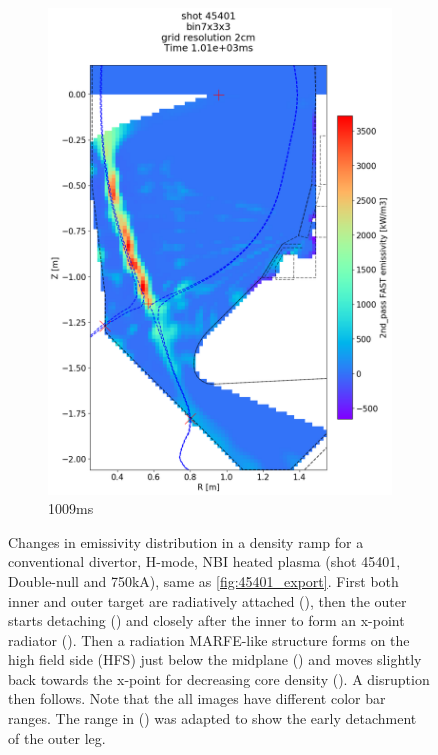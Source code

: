 \begin{figure}
\begin{subfigure}{0.395\linewidth}
         \includegraphics[trim={75 95 0 195},clip,width=\textwidth]{Chapters/chapter2/figs/IRVB-MASTU_shot-45401_export_90.png}
         \vspace*{-6.5mm}
         \caption{1009ms}
         \label{fig:45401_export2_5}
     \end{subfigure}
    \vspace*{-3mm}
    \caption{Changes in emissivity distribution in a density ramp for a conventional divertor, H-mode, NBI heated plasma (shot 45401, Double-null and 750kA), same as \autoref{fig:45401_export}. First both inner and outer target are radiatively attached (), then the outer starts detaching () and closely after the inner to form an x-point radiator (). Then a radiation MARFE-like structure forms on the high field side (HFS) just below the midplane () and moves slightly back towards the x-point for decreasing core density (). A disruption then follows. Note that the all images have different color bar ranges. The range in () was adapted to show the early detachment of the outer leg.}
    \label{fig:45401_export2}
\end{figure}
